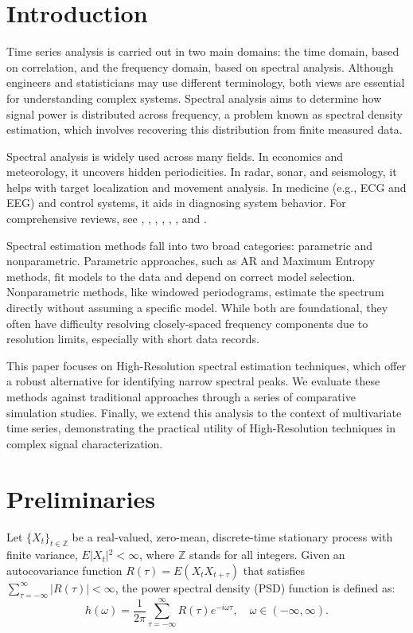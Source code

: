 \documentclass[twoside]{article}
\begin{document}
\section{Introduction}



Time series analysis is carried out in two main domains: the time domain, based on correlation, and the frequency domain, based on spectral analysis. Although engineers and statisticians may use different terminology, both views are essential for understanding complex systems. Spectral analysis aims to determine how signal power is distributed across frequency, a problem known as spectral density estimation, which involves recovering this distribution from finite measured data.



Spectral analysis is widely used across many fields. In economics and meteorology, it uncovers hidden periodicities. In radar, sonar, and seismology, it helps with target localization and movement analysis. In medicine (e.g., ECG and EEG) and control systems, it aids in diagnosing system behavior. For comprehensive reviews, see \cite{Kay:1988}, \cite{Marple:1987}, \cite{StoicaMoses:1997}, \cite{StoicaMoses:2005}, \cite{PercivalWalden:1993}, \cite{Carbone:2022}, and \cite{ShumwayStoffer:2025}.



Spectral estimation methods fall into two broad categories: parametric and nonparametric. Parametric approaches, such as AR and Maximum Entropy methods, fit models to the data and depend on correct model selection. Nonparametric methods, like windowed periodograms, estimate the spectrum directly without assuming a specific model. While both are foundational, they often have difficulty resolving closely-spaced frequency components due to resolution limits, especially with short data records.



This paper focuses on High-Resolution spectral estimation techniques, which offer a robust alternative for identifying narrow spectral peaks. We evaluate these methods against traditional approaches through a series of comparative simulation studies. Finally, we extend this analysis to the context of multivariate time series, demonstrating the practical utility of High-Resolution techniques in complex signal characterization.



\section{Preliminaries}
Let $\{X_t\}_{t \in \mathbb{Z}}$ be a real-valued, zero-mean, discrete-time stationary process with finite variance, $E\vert{}X_t\vert{}^2 < \infty$,  where $\mathbb{Z}$ stands for all integers. Given an autocovariance function $R(\tau) = E(X_t X_{t+\tau})$ that satisfies $\sum_{\tau=-\infty}^{\infty} \vert{}R(\tau)\vert{} < \infty$, the power spectral density (PSD) function is defined as:
\begin{equation}
h(\omega) = \frac{1}{2\pi} \sum_{\tau=-\infty}^{\infty} R(\tau) e^{-i\omega \tau}, \quad \omega \in (-\infty, \infty).
\end{equation}
\end{document}
